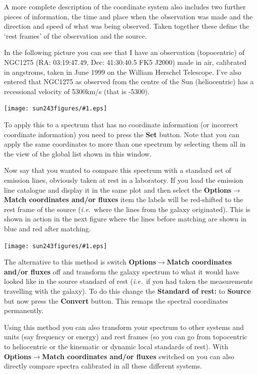 \documentclass[twoside,11pt]{article}
\newcommand{\htmladdimg}[1]{}
\newcommand{\latexhtml}[2]{#1}
\renewcommand{\_}{\texttt{\symbol{95}}}
\newcommand{\mainfigure}[1]
{\begin{center}
 \latexhtml{\texttt{[image: sun243\_figures/\#1.eps]}}{\htmladdimg{#1.gif}}
 \end{center}
}
\newcommand{\submenuitem}[2]{\latexhtml{\textbf{#1$\rightarrow$#2}}{\textbf{#1->#2}}}
\newcommand{\labelitem}[1]{\textbf{#1}}
\newcommand{\ie}{\textit{i.e.}}
\begin{document}
A more complete description of the coordinate system also includes two further
pieces of information, the time and place when the observation was made and
the direction and speed of what was being observed. Taken together these
define the `rest frames' of the observation and the source.

In the following picture you can see that I have an observation (topocentric)
of NGC1275 (RA: 03:19:47.49, Dec: 41:30:40.5 FK5 J2000) made in air,
calibrated in angstroms, taken in June 1999 on the William Herschel
Telescope. I've also entered that NGC1275 as observed from the centre of the
Sun (heliocentric) has a recessional velocity of 5300km/s (that is -5300).

\mainfigure{coordinatesystemwindow}

To apply this to a spectrum that has no coordinate information (or incorrect
coordinate information) you need to press the \labelitem{Set} button. Note
that you can apply the same coordinates to more than one spectrum by selecting
them all in the view of the global list shown in this window.

Now say that you wanted to compare this spectrum with a standard set of
emission lines, obviously taken at rest in a laboratory. If you load the
emission line catalogue and display it in the same plot and then select the
\submenuitem{Options}{Match coordinates and/or fluxes} item the labels will be
red-shifted to the rest frame of the source (\ie\ where the lines from the
galaxy originated). This is shown in action in the next figure where the lines
before matching are shown in blue and red after matching.

\mainfigure{coordinatesystemplot}

The alternative to this method is switch
\submenuitem{Options}{Match coordinates and/or fluxes} off and transform the
galaxy spectrum to what it would have looked like in the source standard of
rest (\ie\ if you had taken the measurements travelling with the galaxy). To
do this change the \labelitem{Standard of rest:} to \labelitem{Source} but now
press the \labelitem{Convert} button. This remaps the spectral coordinates
permanently.

Using this method you can also transform your spectrum to other systems and
units (say frequency or energy) and rest frames (so you can go from
topocentric to heliocentric or the kinematic or dynamic local standards of
rest). With \submenuitem{Options}{Match coordinates and/or fluxes} switched on
you can also directly compare spectra calibrated in all these different
systems.
\end{document}
